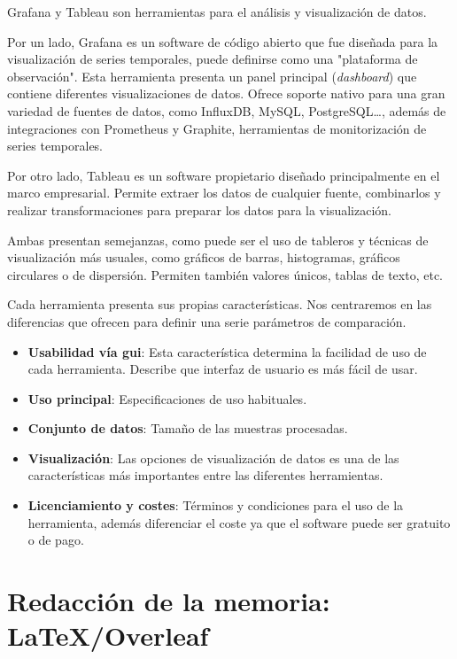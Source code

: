 \documentclass[a4paper, 12pt]{book}
\begin{document}
Grafana y Tableau son herramientas para el análisis y visualización de datos. 

Por un lado, Grafana es un software de código abierto que fue diseñada para la visualización de series temporales, puede definirse como una "plataforma de observación". 
Esta herramienta presenta un panel principal (\textit{dashboard}) que contiene diferentes visualizaciones de datos. Ofrece soporte nativo para una gran variedad de fuentes de datos, como InfluxDB, MySQL, PostgreSQL\ldots, además de integraciones con Prometheus y Graphite, herramientas de monitorización de series temporales. 

Por otro lado, Tableau es un software propietario diseñado principalmente en el marco empresarial. Permite extraer los datos de cualquier fuente, combinarlos y realizar transformaciones para preparar los datos para la visualización. 

Ambas presentan semejanzas, como puede ser el uso de tableros y técnicas de visualización más usuales, como gráficos de barras, histogramas, gráficos circulares o de dispersión. Permiten también valores únicos, tablas de texto, etc.   

Cada herramienta presenta sus propias características. %
Nos centraremos en las diferencias que ofrecen para definir una serie parámetros de comparación. 
\begin{itemize}
    \item \textbf{Usabilidad vía {\gls{gui}}}: Esta característica determina la facilidad de uso de cada herramienta. Describe que interfaz de usuario es más fácil de usar. 
    \item \textbf{Uso principal}: Especificaciones de uso habituales. 
    \item \textbf{Conjunto de datos}: Tamaño de las muestras procesadas.
    \item \textbf{Visualización}: Las opciones de visualización de datos es una de las características más importantes entre las diferentes herramientas. 
    \item \textbf{Licenciamiento y costes}: Términos y condiciones para el uso de la herramienta, además diferenciar el coste ya que el software puede ser gratuito o de pago. 
\end{itemize}


\section{Redacción de la memoria: LaTeX/Overleaf}
\label{sec:redaccion_de_la_memoria}
\end{document}
